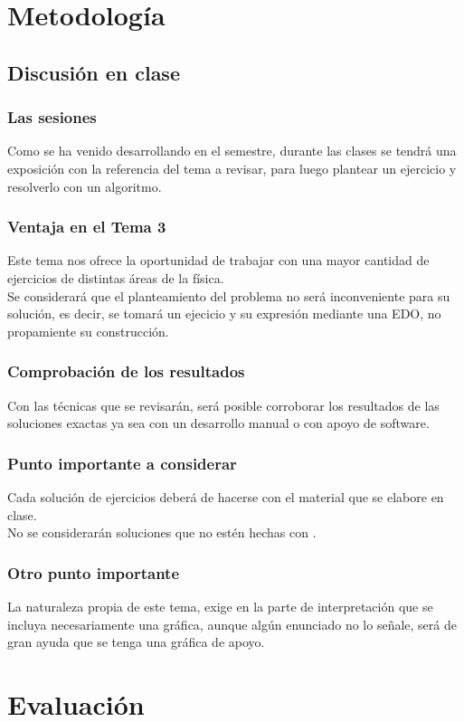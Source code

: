 \documentclass[12pt]{beamer}
\begin{document}
\section{Metodología}
\subsection{Discusión en clase}

\begin{frame}
\frametitle{Las sesiones}
Como se ha venido desarrollando en el semestre, durante las clases se tendrá una exposición con la referencia del tema a revisar, para luego plantear un ejercicio y resolverlo con un algoritmo.
\end{frame}
\begin{frame}
\frametitle{Ventaja en el Tema 3}
Este tema nos ofrece la oportunidad de trabajar con una mayor cantidad de ejercicios de distintas áreas de la física.
\\
\bigskip
\pause
Se considerará que el planteamiento del problema no será inconveniente para su solución, es decir, se tomará un ejecicio y su expresión mediante una EDO, no propamiente su construcción.
\end{frame}
\begin{frame}
\frametitle{Comprobación de los resultados}
Con las técnicas que se revisarán, será posible corroborar los resultados de las soluciones exactas ya sea con un desarrollo manual o con apoyo de software.
\end{frame}
\begin{frame}
\frametitle{Punto importante a considerar}
Cada solución de ejercicios deberá de hacerse con el material que se elabore en clase.
\\
\bigskip
\pause
No se considerarán soluciones que no estén hechas con \python.
\end{frame}
\begin{frame}
\frametitle{Otro punto importante}
La naturaleza propia de este tema, exige en la parte de interpretación que se incluya necesariamente una gráfica, aunque algún enunciado no lo señale, será de gran ayuda que se tenga una gráfica de apoyo.
\end{frame}

\section{Evaluación}
\end{document}
